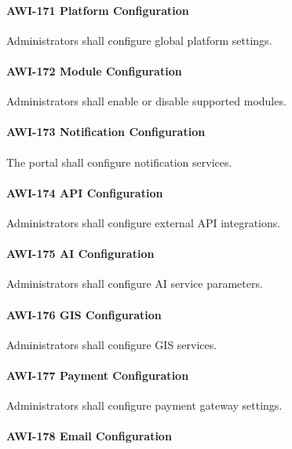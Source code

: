 \paragraph{AWI-171 Platform Configuration}

Administrators shall configure global platform settings.

\paragraph{AWI-172 Module Configuration}

Administrators shall enable or disable supported modules.

\paragraph{AWI-173 Notification Configuration}

The portal shall configure notification services.

\paragraph{AWI-174 API Configuration}

Administrators shall configure external API integrations.

\paragraph{AWI-175 AI Configuration}

Administrators shall configure AI service parameters.

\paragraph{AWI-176 GIS Configuration}

Administrators shall configure GIS services.

\paragraph{AWI-177 Payment Configuration}

Administrators shall configure payment gateway settings.

\paragraph{AWI-178 Email Configuration}

